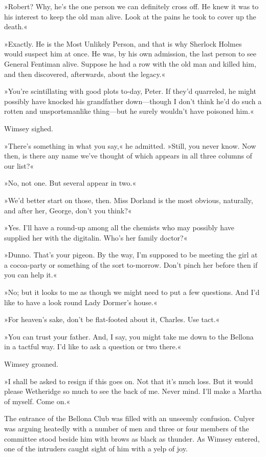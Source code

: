 »Robert? Why, he's the one person we can definitely cross off. He knew it was to his interest to keep the old man alive. Look at the pains he took to cover up the death.«

»Exactly. He is the Most Unlikely Person, and that is why Sherlock Holmes would suspect him at once. He was, by his own admission, the last person to see General Fentiman alive. Suppose he had a row with the old man and killed him, and then discovered, afterwards, about the legacy.«

»You're scintillating with good plots to-day, Peter. If they'd quarreled, he might possibly have knocked his grandfather down—though I don't think he'd do such a rotten and unsportsmanlike thing—but he surely wouldn't have poisoned him.«

Wimsey sighed.

»There's something in what you say,« he admitted. »Still, you never know. Now then, is there any name we've thought of which appears in all three columns of our list?«

»No, not one. But several appear in two.«

»We'd better start on those, then. Miss Dorland is the most obvious, naturally, and after her, George, don't you think?«

»Yes. I'll have a round-up among all the chemists who may possibly have supplied her with the digitalin. Who's her family doctor?«

»Dunno. That's your pigeon. By the way, I'm supposed to be meeting the girl at a cocoa-party or something of the sort to-morrow. Don't pinch her before then if you can help it.«

»No; but it looks to me as though we might need to put a few questions. And I'd like to have a look round Lady Dormer's house.«

»For heaven's sake, don't be flat-footed about it, Charles. Use tact.«

»You can trust your father. And, I say, you might take me down to the Bellona in a tactful way. I'd like to ask a question or two there.«

Wimsey groaned.

»I shall be asked to resign if this goes on. Not that it's much loss. But it would please Wetheridge so much to see the back of me. Never mind. I'll make a Martha of myself. Come on.«

The entrance of the Bellona Club was filled with an unseemly confusion. Culyer was arguing heatedly with a number of men and three or four members of the committee stood beside him with brows as black as thunder. As Wimsey entered, one of the intruders caught sight of him with a yelp of joy.

